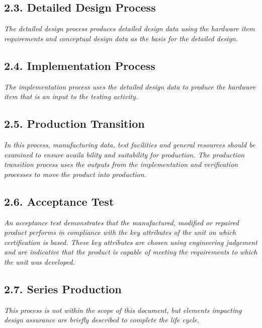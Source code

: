 \documentclass[]{article}
\begin{document}
\subsection{2.3. Detailed Design Process}\label{detailed-design-process}

\emph{The detailed design process produces detailed design data using
the hardware item requirements and conceptual design data as the basis
for the detailed design.}

\subsection{2.4. Implementation Process}\label{implementation-process}

\emph{The implementation process uses the detailed design data to
produce the hardware item that is an input to the testing activity.}

\subsection{2.5. Production Transition}\label{production-transition}

\emph{In this process, manufacturing data, test facilities and general
resources should be examined to ensure availa bility and suitability for
production. The production transition process uses the outputs from the
implementation and verification processes to move the product into
production.}

\subsection{2.6. Acceptance Test}\label{acceptance-test}

\emph{An acceptance test demonstrates that the manufactured, modified or
repaired product performs in compliance with the key attributes of the
unit on which certification is based. These key attributes are chosen
using engineering judgement and are indicative that the product is
capable of meeting the requirements to which the unit was developed.}

\subsection{2.7. Series Production}\label{series-production}

\emph{This process is not within the scope of this document, but
elements impacting design assurance are briefly described to complete
the life cycle.}
\end{document}
